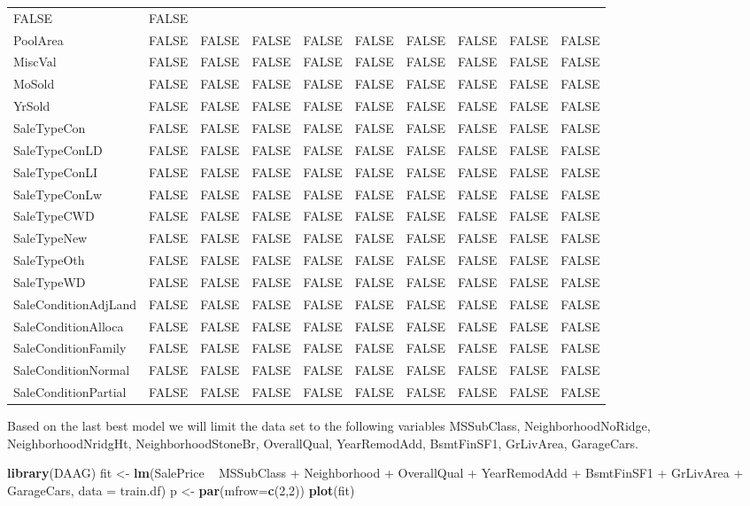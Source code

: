 \documentclass[]{article}
\newenvironment{Shaded}{\begin{snugshade}}{\end{snugshade}}
\newcommand{\KeywordTok}[1]{\textcolor[rgb]{0.13,0.29,0.53}{\textbf{{#1}}}}
\newcommand{\DataTypeTok}[1]{\textcolor[rgb]{0.13,0.29,0.53}{{#1}}}
\newcommand{\DecValTok}[1]{\textcolor[rgb]{0.00,0.00,0.81}{{#1}}}
\newcommand{\StringTok}[1]{\textcolor[rgb]{0.31,0.60,0.02}{{#1}}}
\newcommand{\NormalTok}[1]{{#1}}
\begin{document}
\begin{longtable}[]{@{}llllllllll@{}}
FALSE & FALSE\tabularnewline
PoolArea & FALSE & FALSE & FALSE & FALSE & FALSE & FALSE & FALSE & FALSE
& FALSE\tabularnewline
MiscVal & FALSE & FALSE & FALSE & FALSE & FALSE & FALSE & FALSE & FALSE
& FALSE\tabularnewline
MoSold & FALSE & FALSE & FALSE & FALSE & FALSE & FALSE & FALSE & FALSE &
FALSE\tabularnewline
YrSold & FALSE & FALSE & FALSE & FALSE & FALSE & FALSE & FALSE & FALSE &
FALSE\tabularnewline
SaleTypeCon & FALSE & FALSE & FALSE & FALSE & FALSE & FALSE & FALSE &
FALSE & FALSE\tabularnewline
SaleTypeConLD & FALSE & FALSE & FALSE & FALSE & FALSE & FALSE & FALSE &
FALSE & FALSE\tabularnewline
SaleTypeConLI & FALSE & FALSE & FALSE & FALSE & FALSE & FALSE & FALSE &
FALSE & FALSE\tabularnewline
SaleTypeConLw & FALSE & FALSE & FALSE & FALSE & FALSE & FALSE & FALSE &
FALSE & FALSE\tabularnewline
SaleTypeCWD & FALSE & FALSE & FALSE & FALSE & FALSE & FALSE & FALSE &
FALSE & FALSE\tabularnewline
SaleTypeNew & FALSE & FALSE & FALSE & FALSE & FALSE & FALSE & FALSE &
FALSE & FALSE\tabularnewline
SaleTypeOth & FALSE & FALSE & FALSE & FALSE & FALSE & FALSE & FALSE &
FALSE & FALSE\tabularnewline
SaleTypeWD & FALSE & FALSE & FALSE & FALSE & FALSE & FALSE & FALSE &
FALSE & FALSE\tabularnewline
SaleConditionAdjLand & FALSE & FALSE & FALSE & FALSE & FALSE & FALSE &
FALSE & FALSE & FALSE\tabularnewline
SaleConditionAlloca & FALSE & FALSE & FALSE & FALSE & FALSE & FALSE &
FALSE & FALSE & FALSE\tabularnewline
SaleConditionFamily & FALSE & FALSE & FALSE & FALSE & FALSE & FALSE &
FALSE & FALSE & FALSE\tabularnewline
SaleConditionNormal & FALSE & FALSE & FALSE & FALSE & FALSE & FALSE &
FALSE & FALSE & FALSE\tabularnewline
SaleConditionPartial & FALSE & FALSE & FALSE & FALSE & FALSE & FALSE &
FALSE & FALSE & FALSE\tabularnewline
\bottomrule
\end{longtable}

Based on the last best model we will limit the data set to the following
variables MSSubClass, NeighborhoodNoRidge, NeighborhoodNridgHt,
NeighborhoodStoneBr, OverallQual, YearRemodAdd, BsmtFinSF1, GrLivArea,
GarageCars.

\begin{Shaded}
\begin{Highlighting}[]
\KeywordTok{library}\NormalTok{(DAAG)}
\NormalTok{fit <-}\StringTok{ }\KeywordTok{lm}\NormalTok{(SalePrice ~}\StringTok{ }\NormalTok{MSSubClass +}\StringTok{ }\NormalTok{Neighborhood +}\StringTok{ }\NormalTok{OverallQual +}\StringTok{ }\NormalTok{YearRemodAdd +}\StringTok{ }\NormalTok{BsmtFinSF1 +}\StringTok{ }\NormalTok{GrLivArea +}\StringTok{ }\NormalTok{GarageCars, }\DataTypeTok{data =} \NormalTok{train.df)}
\NormalTok{p <-}\StringTok{ }\KeywordTok{par}\NormalTok{(}\DataTypeTok{mfrow=}\KeywordTok{c}\NormalTok{(}\DecValTok{2}\NormalTok{,}\DecValTok{2}\NormalTok{))}
\KeywordTok{plot}\NormalTok{(fit)}
\end{Highlighting}
\end{Shaded}
\end{document}
